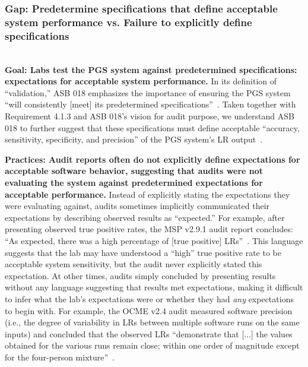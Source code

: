 \subsubsection{Gap: Predetermine specifications that define acceptable system performance vs. Failure to explicitly define specifications}
\label{sec:stds-gap1}
\textbf{\\Goal: Labs test the PGS system against predetermined specifications: expectations for acceptable system performance.} In its definition of ``validation,'' ASB 018 emphasizes the importance of ensuring the PGS system ``will consistently [meet] its predetermined specifications''~\cite[p.2]{asb018}. Taken together with Requirement 4.1.3 and ASB 018's vision for audit purpose, we understand ASB 018 to further suggest that these specifications must define acceptable ``accuracy, sensitivity, specificity, and precision'' of the PGS system's LR output~\cite[R4.1.3]{asb018}. 


\textbf{Practices: Audit reports often do not explicitly define expectations for acceptable software behavior, suggesting that audits were not evaluating the system against predetermined expectations for acceptable performance.} Instead of explicitly stating the expectations they were evaluating against, audits sometimes implicitly communicated their expectations by describing observed results as ``expected.'' For example, after presenting observed true positive rates, the MSP v2.9.1 audit report concludes: ``As expected, there was a high percentage of [true positive] LRs''~\cite[p.27]{mspIV}. This language suggests that the lab may have understood a ``high'' true positive rate to be acceptable system sensitivity, but the audit never explicitly stated this expectation. At other times, audits simply concluded by presenting results without any language suggesting that results met expectations, making it difficult to infer what the lab's expectations were or whether they had \textit{any} expectations to begin with. For example, the OCME v2.4 audit measured software precision (i.e., the degree of variability in LRs between multiple software runs on the same inputs) and concluded that the observed LRs ``demonstrate that [...] the values obtained for the various runs remain close; within one order of magnitude except for the four-person mixture''~\cite[p.19]{ocmeIV}. 



